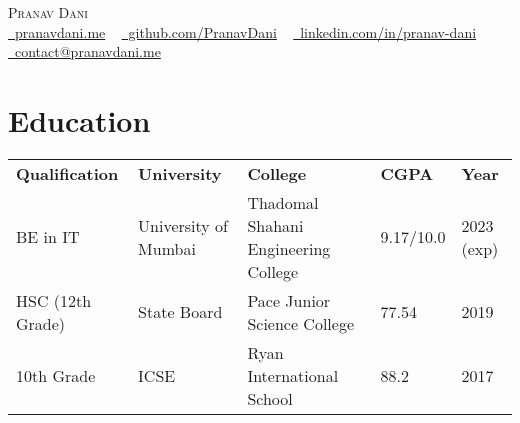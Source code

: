 \documentclass[letterpaper,11pt]{article}
\begin{document}

\begin{center}
    {\huge \scshape Pranav Dani} \\ \vspace{4pt}
    \small
    \faGlobe \href{https://pranavdani.me}{\raisebox{-0.1\height}\ pranavdani.me} ~
    \faGithub \href{https://github.com/PranavDani}{\raisebox{-0.2\height}\ github.com/PranavDani} ~
    \faLinkedin \href{https://linkedin.com/in/pranav-dani}{\raisebox{-0.2\height}\ linkedin.com/in/pranav-dani} ~
    \faEnvelope \href{mailto:contact@pranavdani.me}{\raisebox{-0.2\height}\  contact@pranavdani.me}
    \vspace{-10pt}
\end{center}


\section{Education}
    \vspace{-4pt}
    \begin{itemize}[leftmargin=0.2in, label={}]
        {\item{
            \begin{tabular}{ l@{\hskip 0.2in} l@{\hskip 0.2in} l@{\hskip 0.2in} l@{\hskip 0.2in} l }
                 \textbf{Qualification} & \textbf{University} & \textbf{College} & \textbf{CGPA} & \textbf{Year} \\
                 BE in IT & University of Mumbai & Thadomal Shahani Engineering College & 9.17/10.0 & 2023 (exp) \\
                 HSC (12th Grade) & State Board & Pace Junior Science College & 77.54 & 2019 \\
                 10th Grade & ICSE & Ryan International School & 88.2 & 2017
            \end{tabular}
        }}
    \end{itemize}
\vspace{-20pt}
\end{document}
